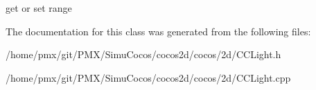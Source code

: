 get or set range 

The documentation for this class was generated from the following files\+:\begin{DoxyCompactItemize}
\item 
/home/pmx/git/\+P\+M\+X/\+Simu\+Cocos/cocos2d/cocos/2d/C\+C\+Light.\+h\item 
/home/pmx/git/\+P\+M\+X/\+Simu\+Cocos/cocos2d/cocos/2d/C\+C\+Light.\+cpp\end{DoxyCompactItemize}
